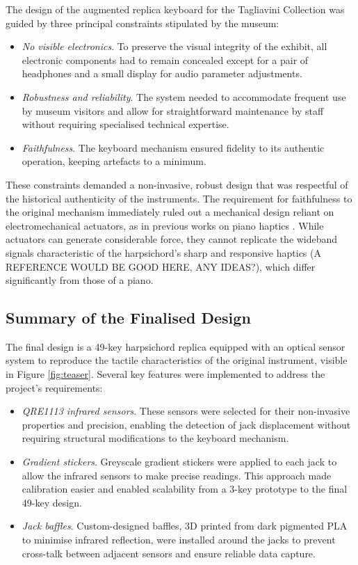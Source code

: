The design of the augmented replica keyboard for the Tagliavini Collection was guided by three principal constraints stipulated by the museum:
\begin{itemize}
\item \emph{No visible electronics}. To preserve the visual integrity of the exhibit, all electronic components had to remain concealed except for a pair of headphones and a small display for audio parameter adjustments.
\item \emph{Robustness and reliability}. The system needed to accommodate frequent use by museum visitors and allow for straightforward maintenance by staff without requiring specialised technical expertise.
\item \emph{Faithfulness}. The keyboard mechanism ensured fidelity to its authentic operation, keeping artefacts to a minimum. 
\end{itemize}
These constraints demanded a non-invasive, robust design that was respectful of the historical authenticity of the instruments. The requirement for faithfulness to the original mechanism immediately ruled out a mechanical design reliant on electromechanical actuators, as in previous works on piano haptics \cite{Timmermans2020,Gillespie1996}. While actuators can generate considerable force, they cannot replicate the wideband signals characteristic of the harpsichord's sharp and responsive haptics (A REFERENCE WOULD BE GOOD HERE, ANY IDEAS?), which differ significantly from those of a piano.



\subsection{Summary of the Finalised Design}

The final design is a 49-key harpsichord replica equipped with an optical sensor system to reproduce the tactile characteristics of the original instrument, visible in Figure \ref{fig:teaser}. Several key features were implemented to address the project’s requirements:

\begin{itemize}
\item \emph{QRE1113 infrared sensors}. These sensors were selected for their non-invasive properties and precision, enabling the detection of jack displacement without requiring structural modifications to the keyboard mechanism.
\item \emph{Gradient stickers}. Greyscale gradient stickers were applied to each jack to allow the infrared sensors to make precise readings. This approach made calibration easier and enabled scalability from a 3-key prototype to the final 49-key design.
\item \emph{Jack baffles}. Custom-designed baffles, 3D printed from dark pigmented PLA to minimise infrared reflection, were installed around the jacks to prevent cross-talk between adjacent sensors and ensure reliable data capture.
\end{itemize}

